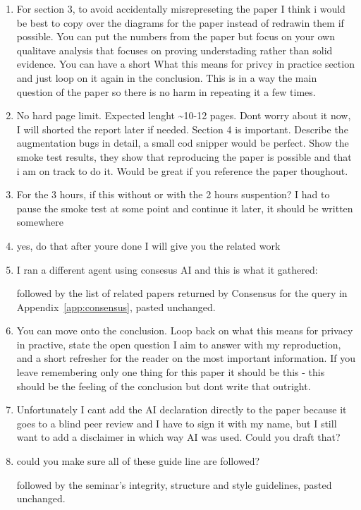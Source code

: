 \documentclass[a4paper]{article}
\newcommand{\prompt}[1]{{\raggedright\small\ttfamily\frenchspacing #1\par}}
\begin{document}
\begin{enumerate}
  \item \prompt{For section 3, to avoid accidentally misrepreseting the paper I think i would be best to copy over the diagrams for the paper instead of redrawin them if possible. You can put the numbers from the paper but focus on your own qualitave analysis that focuses on proving understading rather than solid evidence. You can have a short \textquotedbl{}What this means for privcy in practice\textquotedbl{} section and just loop on it again in the conclusion. This is in a way the main question of the paper so there is no harm in repeating it a few times.}
  \item \prompt{No hard page limit. Expected lenght \textasciitilde{}10-12 pages. Dont worry about it now, I will shorted the report later if needed. Section 4 is important. Describe the augmentation bugs in detail, a small cod snipper would be perfect. Show the smoke test results, they show that reproducing the paper is possible and that i am on track to do it. Would be great if you reference the paper thoughout.}
  \item \prompt{For the 3 hours, if this without or with the 2 hours suspention? I had to pause the smoke test at some point and continue it later, it should be written somewhere}
  \item \prompt{yes, do that after youre done I will give you the related work}
  \item \prompt{I ran a different agent using consesus AI and this is what it gathered:}
  followed by the list of related papers returned by Consensus for the query in Appendix~\ref{app:consensus}, pasted unchanged.
  \item \prompt{You can move onto the conclusion. Loop back on \textquotedbl{}what this means for privacy in practive\textquotedbl{}, state the open question I aim to answer with my reproduction, and a short refresher for the reader on the most important information. \textquotedbl{}If you leave remembering only one thing for this paper it should be this\textquotedbl{} - this should be the feeling of the conclusion but dont write that outright.}
  \item \prompt{Unfortunately I cant add the AI declaration directly to the paper because it goes to a blind peer review and I have to sign it with my name, but I still want to add a disclaimer in which way AI was used. Could you draft that?}
  \item \prompt{could you make sure all of these guide line are followed?}
  followed by the seminar's integrity, structure and style guidelines, pasted unchanged.

\end{enumerate}
\end{document}

